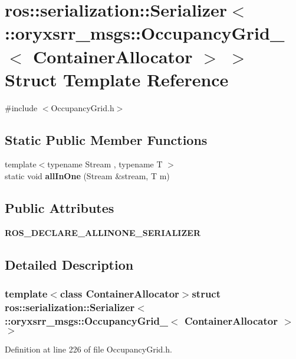 \section{ros\-:\-:serialization\-:\-:\-Serializer$<$ \-:\-:oryxsrr\-\_\-msgs\-:\-:\-Occupancy\-Grid\-\_\-$<$ \-Container\-Allocator $>$ $>$ \-Struct \-Template \-Reference}
\label{structros_1_1serialization_1_1Serializer_3_01_1_1oryxsrr__msgs_1_1OccupancyGrid___3_01ContainerAllocator_01_4_01_4}


{\ttfamily \#include $<$\-Occupancy\-Grid.\-h$>$}

\subsection*{\-Static \-Public \-Member \-Functions}
\begin{DoxyCompactItemize}
\item 
{\footnotesize template$<$typename Stream , typename T $>$ }\\static void {\bf all\-In\-One} (\-Stream \&stream, \-T m)
\end{DoxyCompactItemize}
\subsection*{\-Public \-Attributes}
\begin{DoxyCompactItemize}
\item 
{\bf \-R\-O\-S\-\_\-\-D\-E\-C\-L\-A\-R\-E\-\_\-\-A\-L\-L\-I\-N\-O\-N\-E\-\_\-\-S\-E\-R\-I\-A\-L\-I\-Z\-E\-R}
\end{DoxyCompactItemize}


\subsection{\-Detailed \-Description}
\subsubsection*{template$<$class Container\-Allocator$>$struct ros\-::serialization\-::\-Serializer$<$ \-::oryxsrr\-\_\-msgs\-::\-Occupancy\-Grid\-\_\-$<$ Container\-Allocator $>$ $>$}



\-Definition at line 226 of file \-Occupancy\-Grid.\-h.



